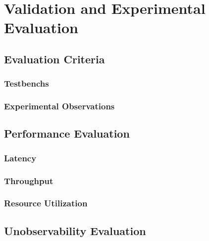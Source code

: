 
%

\chapter{Validation and Experimental Evaluation}\label{cha:validation}

\section{Evaluation Criteria}\label{sec:evaluation_criteria}

\subsection{Testbenchs}\label{sec:testbenchs}

\subsection{Experimental Observations}\label{sec:experimental_observations}

\section{Performance Evaluation}\label{sec:performance_evaluation}

\subsection{Latency}\label{sec:performance_evaluation_latency}

\subsection{Throughput}\label{sec:performance_evaluation_throughput}

\subsection{Resource Utilization}\label{sec:performance_evaluation_resource_utilization}

\section{Unobservability Evaluation}\label{sec:unobservability_evaluation}

